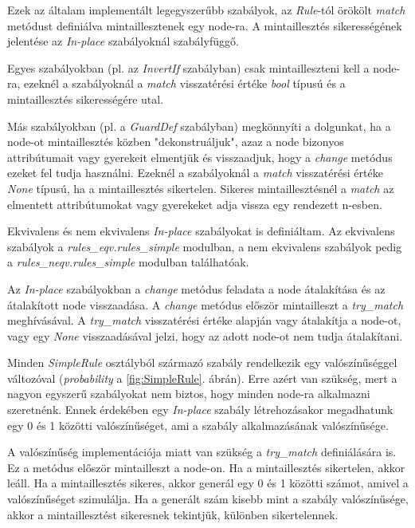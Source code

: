 Ezek az általam implementált legegyszerűbb szabályok,
az \emph{Rule}-tól örökölt \emph{match} metódust definiálva mintaillesztenek egy node-ra.
A mintaillesztés sikerességének jelentése az \emph{In-place} szabályoknál szabályfüggő.

Egyes szabályokban (pl. az \emph{InvertIf} szabályban) csak mintailleszteni kell a node-ra,
ezeknél a szabályoknál a \emph{match} visszatérési értéke \emph{bool} típusú
és a mintaillesztés sikerességére utal.

Más szabályokban (pl. a \emph{GuardDef} szabályban) megkönnyíti a dolgunkat,
ha a node-ot mintaillesztés közben "dekonstruáljuk", 
azaz a node bizonyos attribútumait vagy gyerekeit elmentjük és visszaadjuk,
hogy a \emph{change} metódus ezeket fel tudja használni.
Ezeknél a szabályoknál a \emph{match} visszatérési értéke \emph{None} típusú,
ha a mintaillesztés sikertelen.
Sikeres mintaillesztésnél a \emph{match} az elmentett attribútumokat vagy gyerekeket adja vissza
egy rendezett n-esben.

Ekvivalens és nem ekvivalens \emph{In-place} szabályokat is definiáltam.
Az ekvivalens szabályok
a \emph{rules\_eqv.rules\_simple} modulban,
a nem ekvivalens szabályok pedig
a \emph{rules\_neqv.rules\_simple} modulban
találhatóak.

Az \emph{In-place} szabályokban a \emph{change} metódus feladata a node átalakítása
és az átalakított node visszaadása.
A \emph{change} metódus először mintailleszt a \emph{try\_match} meghívásával.
A \emph{try\_match} visszatérési értéke alapján vagy átalakítja a node-ot,
vagy egy \emph{None} visszaadásával jelzi, hogy az adott node-ot nem tudja átalakítani.

Minden \emph{SimpleRule} osztályból származó szabály rendelkezik egy valószínűséggel változóval
(\emph{probability} a \ref{fig:SimpleRule}. ábrán).
Erre azért van szükség, mert a nagyon egyszerű szabályokat nem biztos,
hogy minden node-ra alkalmazni szeretnénk.
Ennek érdekében egy \emph{In-place} szabály létrehozásakor megadhatunk
egy 0 és 1 közötti valószínűséget, ami a szabály alkalmazásának valószínűsége.

A valószínűség implementációja miatt van szükség a \emph{try\_match} definiálására is.
Ez a metódus először mintailleszt a node-on.
Ha a mintaillesztés sikertelen, akkor leáll.
Ha a mintaillesztés sikeres,
akkor generál egy 0 és 1 közötti számot,
amivel a valószínűséget szimulálja.
Ha a generált szám kisebb mint a szabály valószínűsége,
akkor a mintaillesztést sikeresnek tekintjük, különben sikertelennek.

